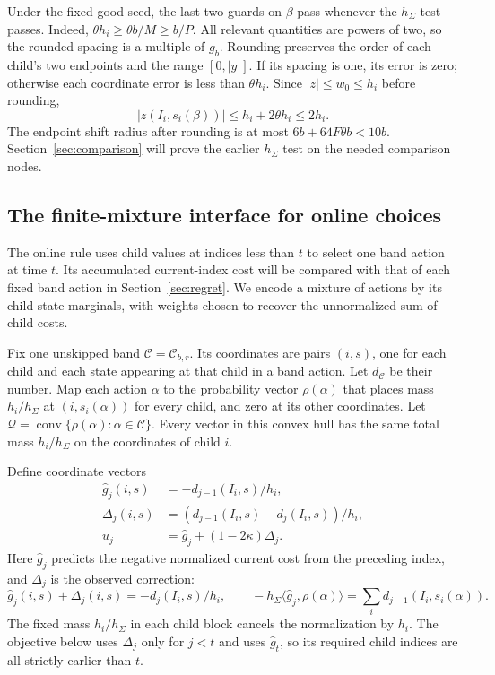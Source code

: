 Under the fixed good seed, the last two guards on $\beta$ pass
whenever the $h_\Sigma$ test passes.  Indeed,
$\theta h_i\ge\theta b/M\ge b/P$.  All relevant quantities are
powers of two, so the rounded spacing is a multiple of $g_b$.
Rounding preserves the order of each child's two endpoints and the range
$[0,|y|]$. If its
spacing is one, its error is zero; otherwise each coordinate error is
less than $\theta h_i$.  Since $|z|\le w_0\le h_i$ before rounding,
\[
 |z(I_i,s_i(\beta))|\le h_i+2\theta h_i\le2h_i.
\]
The endpoint shift radius after rounding is at most
$6b+64F\theta b<10b$.  Section~\ref{sec:comparison} will prove the
earlier $h_\Sigma$ test on the needed comparison nodes.

\subsection{The finite-mixture interface for online choices}

The online rule uses child values at indices less than $t$ to select
one band action at time $t$. Its accumulated current-index cost will be
compared with that of each fixed band action in Section~\ref{sec:regret}.
We encode a mixture of actions by its child-state marginals, with weights
chosen to recover the unnormalized sum of child costs.

Fix one unskipped band $\mathcal C=\mathcal C_{b,r}$. Its coordinates
are pairs $(i,s)$, one for each child and each state appearing at that
child in a band action.  Let $d_{\mathcal C}$ be their number.  Map
each action $\alpha$ to the probability vector $\rho(\alpha)$ that
places mass $h_i/h_\Sigma$ at $(i,s_i(\alpha))$ for every child,
and zero at its other coordinates.  Let
$\mathcal Q=\operatorname{conv}\{\rho(\alpha):\alpha\in\mathcal C\}$.
Every vector in this convex hull has the same total mass $h_i/h_\Sigma$
on the coordinates of child $i$.

Define coordinate vectors
\begin{align*}
 \widehat g_j(i,s)&=-d_{j-1}(I_i,s)/h_i,\\
 \Delta_j(i,s)&=(d_{j-1}(I_i,s)-d_j(I_i,s))/h_i,\\
 u_j&=\widehat g_j+(1-2\kappa)\Delta_j.
\end{align*}
Here $\widehat g_j$ predicts the negative normalized current cost from
the preceding index, and $\Delta_j$ is the observed correction:
\[
 \widehat g_j(i,s)+\Delta_j(i,s)=-d_j(I_i,s)/h_i,
 \qquad
 -h_\Sigma\langle\widehat g_j,\rho(\alpha)\rangle
 =\sum_i d_{j-1}(I_i,s_i(\alpha)).
\]
The fixed mass $h_i/h_\Sigma$ in each child block cancels the
normalization by $h_i$. The objective below uses $\Delta_j$ only for
$j<t$ and uses $\widehat g_t$, so its required child indices are all
strictly earlier than $t$.

